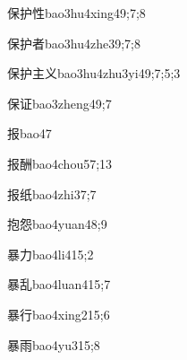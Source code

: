 \begin{verbete}{保护性}{bao3hu4xing4}{9;7;8}
\end{verbete}

\begin{verbete}{保护者}{bao3hu4zhe3}{9;7;8}
\end{verbete}

\begin{verbete}{保护主义}{bao3hu4zhu3yi4}{9;7;5;3}
\end{verbete}

\begin{verbete}{保证}{bao3zheng4}{9;7}
\end{verbete}

\begin{verbete}{报}{bao4}{7}
\end{verbete}

\begin{verbete}{报酬}{bao4chou5}{7;13}
\end{verbete}

\begin{verbete}{报纸}{bao4zhi3}{7;7}
\end{verbete}

\begin{verbete}{抱怨}{bao4yuan4}{8;9}
\end{verbete}

\begin{verbete}{暴力}{bao4li4}{15;2}
\end{verbete}

\begin{verbete}{暴乱}{bao4luan4}{15;7}
\end{verbete}

\begin{verbete}{暴行}{bao4xing2}{15;6}
\end{verbete}

\begin{verbete}{暴雨}{bao4yu3}{15;8}
\end{verbete}


